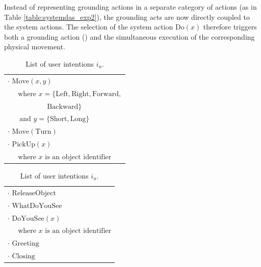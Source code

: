 Instead of representing grounding actions in a separate category of actions (as in Table \ref{table:systemdas_exp2}), the grounding acts are now directly coupled to the system actions. The selection of the system action $\mathrm{Do}(x)$ therefore triggers both a grounding action () and the simultaneous execution of the corresponding physical movement. 

\renewcommand{\arraystretch}{1.3}

\begin{table}[p!]
\begin{footnotesize}
\begin{tabular}{p{60mm}} 
$\cdot$ $\mathrm{Move}(x,y) $ \\ $ \ \ \ \ \ \text{ where } x=\{\mathrm{Left,Right,Forward,}$ \\ $\ \ \ \ \ \ \ \ \ \ \ \ \ \ \ \ \ \ \ \ \ \ \ \ \ \mathrm{Backward}\} $ \\ $ \ \ \ \ \ \ \text{ and } y = \{\mathrm{Short, Long}\}$ \\
$\cdot$ $\mathrm{Move(Turn)} $ \\
$\cdot$ $\mathrm{PickUp}(x) $ \\ $\ \ \ \ \  \text{ where } x \text{ is an object identifier}$ 
\end{tabular}
\hspace{2cm}
\begin{tabular}{p{60mm}} 
$\cdot$ $\mathrm{ReleaseObject} $ \\
$\cdot$ $\mathrm{WhatDoYouSee}$ \\
$\cdot$ $\mathrm{DoYouSee}(x) $ \\ $\ \ \ \ \  \text{ where } x \text{ is an object identifier}$ \\
$\cdot$ $\mathrm{Greeting}$ \\
$\cdot$ $\mathrm{Closing}$ 
\end{tabular}
\end{footnotesize}
 \caption{List of user intentions $i_u$.} 
\label{table:userintents_exp3}
\end{table}


